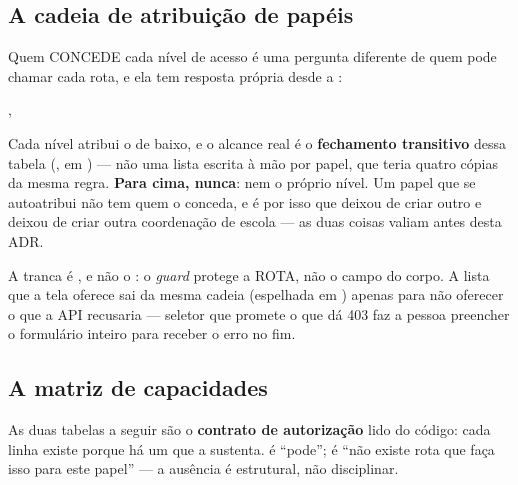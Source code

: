 \subsection{A cadeia de atribuição de papéis}

Quem CONCEDE cada nível de acesso é uma pergunta diferente de quem pode chamar
cada rota, e ela tem resposta própria desde a :

\begin{center}
 \seta{}  \seta{}  \seta{}
 \seta{} , 
\end{center}

Cada nível atribui o de baixo, e o alcance real é o \textbf{fechamento
transitivo} dessa tabela (, em ) --- não
uma lista escrita à mão por papel, que teria quatro cópias da mesma regra.
\textbf{Para cima, nunca}: nem o próprio nível. Um papel que se autoatribui não
tem quem o conceda, e é por isso que  deixou de criar outro
 e  deixou de criar outra coordenação de
escola --- as duas coisas valiam antes desta ADR.

A tranca é , e não o : o \emph{guard} protege a
ROTA, não o campo  do corpo. A lista que a tela oferece sai da mesma
cadeia (espelhada em ) apenas para não oferecer o que a
API recusaria --- seletor que promete o que dá 403 faz a pessoa preencher o
formulário inteiro para receber o erro no fim.

\subsection{A matriz de capacidades}

As duas tabelas a seguir são o \textbf{contrato de autorização} lido do código:
cada linha existe porque há um  que a sustenta. \yes{} é
\enquote{pode}; \no{} é \enquote{não existe rota que faça isso para este papel}
--- a ausência é estrutural, não disciplinar.

